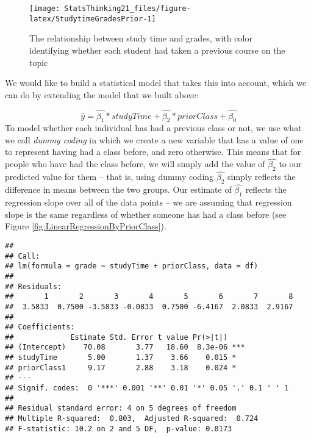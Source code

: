 \documentclass[]{book}
\newenvironment{Shaded}{\begin{snugshade}}{\end{snugshade}}
\newcommand{\KeywordTok}[1]{\textcolor[rgb]{0.13,0.29,0.53}{\textbf{#1}}}
\newcommand{\DataTypeTok}[1]{\textcolor[rgb]{0.13,0.29,0.53}{#1}}
\newcommand{\StringTok}[1]{\textcolor[rgb]{0.31,0.60,0.02}{#1}}
\newcommand{\CommentTok}[1]{\textcolor[rgb]{0.56,0.35,0.01}{\textit{#1}}}
\newcommand{\OperatorTok}[1]{\textcolor[rgb]{0.81,0.36,0.00}{\textbf{#1}}}
\newcommand{\NormalTok}[1]{#1}
\theoremstyle{definition}
\theoremstyle{definition}
\theoremstyle{definition}
\theoremstyle{remark}
\begin{document}
\begin{figure}
\texttt{[image: StatsThinking21\_files/figure-latex/StudytimeGradesPrior-1]} \caption{The relationship between study time and grades, with color identifying whether each student had taken a previous course on the topic}\label{fig:StudytimeGradesPrior}
\end{figure}

We would like to build a statistical model that takes this into account,
which we can do by extending the model that we built above:

\[
\hat{y} = \hat{\beta_1}*studyTime + \hat{\beta_2}*priorClass + \hat{\beta_0}
\] To model whether each individual has had a previous class or not, we
use what we call \emph{dummy coding} in which we create a new variable
that has a value of one to represent having had a class before, and zero
otherwise. This means that for people who have had the class before, we
will simply add the value of \(\hat{\beta_2}\) to our predicted value
for them -- that is, using dummy coding \(\hat{\beta_2}\) simply
reflects the difference in means between the two groups. Our estimate of
\(\hat{\beta_1}\) reflects the regression slope over all of the data
points -- we are assuming that regression slope is the same regardless
of whether someone has had a class before (see Figure
\ref{fig:LinearRegressionByPriorClass}).

\begin{Shaded}
\end{Shaded}

\begin{verbatim}
## 
## Call:
## lm(formula = grade ~ studyTime + priorClass, data = df)
## 
## Residuals:
##       1       2       3       4       5       6       7       8 
##  3.5833  0.7500 -3.5833 -0.0833  0.7500 -6.4167  2.0833  2.9167 
## 
## Coefficients:
##             Estimate Std. Error t value Pr(>|t|)    
## (Intercept)    70.08       3.77   18.60  8.3e-06 ***
## studyTime       5.00       1.37    3.66    0.015 *  
## priorClass1     9.17       2.88    3.18    0.024 *  
## ---
## Signif. codes:  0 '***' 0.001 '**' 0.01 '*' 0.05 '.' 0.1 ' ' 1
## 
## Residual standard error: 4 on 5 degrees of freedom
## Multiple R-squared:  0.803,  Adjusted R-squared:  0.724 
## F-statistic: 10.2 on 2 and 5 DF,  p-value: 0.0173
\end{verbatim}
\end{document}
